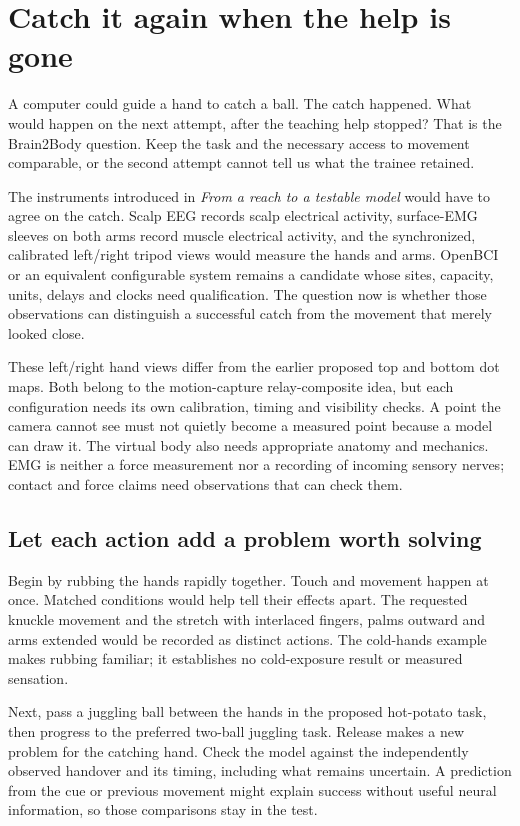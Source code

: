\section{Catch it again when the help is gone}

A computer could guide a hand to catch a ball. The catch happened. What would
happen on the next attempt, after the teaching help stopped? That is the
Brain2Body question. Keep the task and the necessary access to movement
comparable, or the second attempt cannot tell us what the trainee retained.

The instruments introduced in \emph{From a reach to a testable model} would
have to agree on the catch. Scalp EEG records scalp electrical activity,
surface-EMG sleeves on both arms record muscle electrical activity, and the
synchronized, calibrated left/right tripod views would measure the hands and
arms. OpenBCI or an equivalent configurable system remains a candidate whose
sites, capacity, units, delays and clocks need qualification. The question now
is whether those observations can distinguish a successful catch from the
movement that merely looked close.

These left/right hand views differ from the earlier proposed top and bottom
dot maps. Both belong to the motion-capture relay-composite idea, but each
configuration needs its own calibration, timing and visibility checks. A point
the camera cannot see must not quietly become a measured point because a model
can draw it. The virtual body also needs appropriate anatomy and mechanics.
EMG is neither a force measurement nor a recording of incoming sensory nerves;
contact and force claims need observations that can check them.

\subsection{Let each action add a problem worth solving}

Begin by rubbing the hands rapidly together. Touch and movement happen at once.
Matched conditions would help tell their effects apart. The requested knuckle
movement and the stretch with interlaced fingers, palms outward and arms
extended would be recorded as distinct actions. The cold-hands example makes
rubbing familiar; it establishes no cold-exposure result or measured sensation.

Next, pass a juggling ball between the hands in the proposed hot-potato task,
then progress to the preferred two-ball juggling task. Release makes a new
problem for the catching hand. Check the model against the independently
observed handover and its timing, including what remains uncertain. A prediction
from the cue or previous movement might explain success without useful neural
information, so those comparisons stay in the test.

